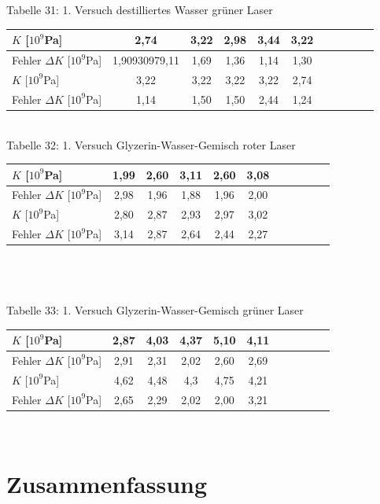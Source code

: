 \documentclass[fontsize=12pt]{scrartcl}
\begin{document}
~\\
~\\ 
Tabelle 31: 1. Versuch destilliertes Wasser grüner Laser \\
\begin{tabular}{|l|c|c|c|c|c|c|c|c|c|c|} \hline
 $K$ [$10^9$Pa] & 2,74 & 3,22 & 2,98 & 3,44 & 3,22   \\ \hline
Fehler  $\Delta K$ [$10^9$Pa] & 1,90930979,11 & 
1,69 & 
1,36 & 
1,14 & 
1,30  \\ \hline
 $K$ [$10^9$Pa] & 3,22 & 3,22 & 3,22 & 3,22 & 2,74   \\ \hline
Fehler  $\Delta K$ [$10^9$Pa] &  1,14 & 
1,50 & 
1,50 & 
2,44 & 
1,24 
\\ \hline 
\end{tabular} \\

\newpage
Tabelle 32: 1. Versuch Glyzerin-Wasser-Gemisch roter Laser \\
\begin{tabular}{|l|c|c|c|c|c|c|c|c|c|c|} \hline
 $K$ [$10^9$Pa] & 1,99 & 2,60 & 3,11 & 2,60 & 3,08  \\ \hline
Fehler $\Delta K$ [$10^9$Pa] &  2,98  & 
1,96 & 
1,88 & 
1,96 & 
2,00
\\ \hline
 $K$ [$10^9$Pa] & 2,80 & 2,87 & 2,93 & 2,97 & 3,02 \\ \hline
Fehler $\Delta K$ [$10^9$Pa] & 3,14 & 
2,87 & 
2,64 & 
2,44 & 
2,27
  \\ \hline
\end{tabular} \\

~\\
~\\
Tabelle 33: 1. Versuch Glyzerin-Wasser-Gemisch grüner Laser\\
\begin{tabular}{|l|c|c|c|c|c|c|c|c|c|c|} \hline
 $K$ [$10^9$Pa] & 2,87 & 4,03 & 4,37 & 5,10 & 4,11  \\ \hline
Fehler $\Delta K$ [$10^9$Pa] & 2,91  & 
2,31 & 
2,02 & 
2,60 & 
2,69
 \\ \hline
 $K$ [$10^9$Pa]  & 4,62 & 4,48 & 4,3 & 4,75 & 4,21  \\ \hline
Fehler $\Delta K$ [$10^9$Pa] &  2,65 & 
2,29 & 
2,02 & 
2,00 & 
3,21
\\ \hline
\end{tabular} \\


\section{Zusammenfassung}
\end{document}
